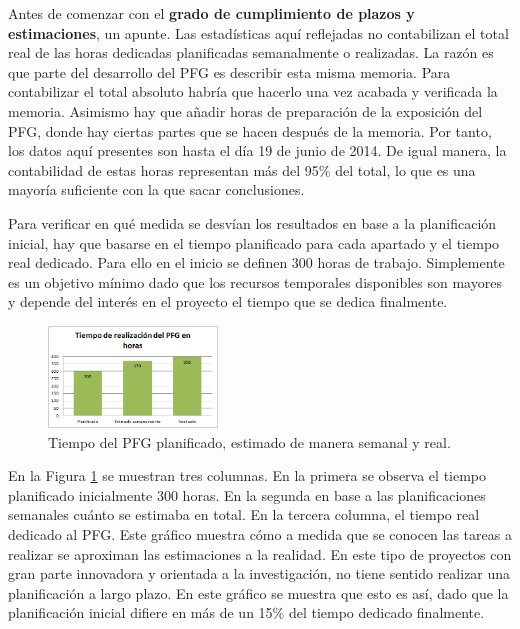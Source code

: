 Antes de comenzar con el \textbf{grado de cumplimiento de plazos y estimaciones}, un apunte. Las estadísticas aquí reflejadas no contabilizan el total real de las horas dedicadas planificadas semanalmente o realizadas. La razón es que parte del desarrollo del PFG es describir esta misma memoria. Para contabilizar el total absoluto habría que hacerlo una vez acabada y verificada la memoria. Asimismo hay que añadir horas de preparación de la exposición del PFG, donde hay ciertas partes que se hacen después de la memoria. Por tanto, los datos aquí presentes son hasta el día 19 de junio de 2014. De igual manera, la contabilidad de estas horas representan más del 95\% del total, lo que es una mayoría suficiente con la que sacar conclusiones.

Para verificar en qué medida se desvían los resultados en base a la planificación inicial, hay que basarse en el tiempo planificado para cada apartado y el tiempo real dedicado. Para ello en el inicio se definen 300 horas de trabajo. Simplemente es un objetivo mínimo dado que los recursos temporales disponibles son mayores y depende del interés en el proyecto el tiempo que se dedica finalmente.

\begin{figure}
\begin{center}
\includegraphics[width=0.40\textwidth]{figs/6-TiemposTotales.png}
\end{center}
\caption{Tiempo del PFG planificado, estimado de manera semanal y real.}
\label{fig:TiemposTotales}
\end{figure}

En la Figura \ref{fig:TiemposTotales} se muestran tres columnas. En la primera se observa el tiempo planificado inicialmente 300 horas. En la segunda en base a las planificaciones semanales cuánto se estimaba en total. En la tercera columna, el tiempo real dedicado al PFG. Este gráfico muestra cómo a medida que se conocen las tareas a realizar se aproximan las estimaciones a la realidad. En este tipo de proyectos con gran parte innovadora y orientada a la investigación, no tiene sentido realizar una planificación a largo plazo. En este gráfico se muestra que esto es así, dado que la planificación inicial difiere en más de un 15\% del tiempo dedicado finalmente.

